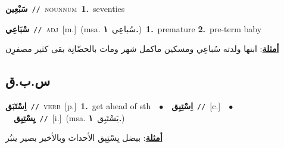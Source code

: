\documentclass[10pt,a4paper,twoside]{article} %
\begin{document}
\begin{multicols}{2}
{\setlength\topsep{0pt}\textbf{\foreignlanguage{arabic}{سَبْعِين}}\ {\color{gray}\texttt{//}\color{black}}\ \textsc{noun\textunderscore num}\ \textbf{1.}~seventies\ } \vspace{2mm}

{\setlength\topsep{0pt}\textbf{\foreignlanguage{arabic}{سْبَاعِي}}\ {\color{gray}\texttt{//}\color{black}}\ \textsc{adj}\ [m.]\ \color{gray}(msa. \foreignlanguage{arabic}{سُباعِي}~\foreignlanguage{arabic}{\textbf{١.}})\color{black}\ \textbf{1.}~premature  \textbf{2.}~pre-term baby\  \begin{flushright}\color{gray}\foreignlanguage{arabic}{\textbf{\underline{\foreignlanguage{arabic}{أمثلة}}}: ابنها ولدته سُباعِي ومسكين ماكمل شهر ومات بالحضّانِة بقى كثير مصفرِن}\end{flushright}\color{black}} \vspace{2mm}

\vspace{-3mm}
\subsection*{\color{blue}\foreignlanguage{arabic}{س.ب.ق}\color{blue}{}} 

{\setlength\topsep{0pt}\textbf{\foreignlanguage{arabic}{اِسْتَبَق}}\ {\color{gray}\texttt{//}\color{black}}\ \textsc{verb}\ [p.]\ \textbf{1.}~get ahead of sth\ \ $\bullet$\ \ \setlength\topsep{0pt}\textbf{\foreignlanguage{arabic}{اِسْتِبِق}}\ {\color{gray}\texttt{//}\color{black}}\ [c.]\ \ $\bullet$\ \ \setlength\topsep{0pt}\textbf{\foreignlanguage{arabic}{يِسْتِبِق}}\ {\color{gray}\texttt{//}\color{black}}\ [i.]\ \color{gray}(msa. \foreignlanguage{arabic}{يَسْتَبِق}~\foreignlanguage{arabic}{\textbf{١.}})\color{black}\  \begin{flushright}\color{gray}\foreignlanguage{arabic}{\textbf{\underline{\foreignlanguage{arabic}{أمثلة}}}: بيضل يِسْتِبِق الأحداث وبالأخير بصير ينبُر}\end{flushright}\color{black}} \vspace{2mm}


\end{multicols}
\end{document}
